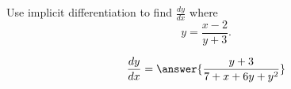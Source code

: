\documentclass{ximera}
\author{Steven Gubkin}
\begin{document}
\begin{exercise}

Use implicit differentiation to find $\frac{dy}{dx}$ where
\[
y = \frac{x-2}{y+3}.
\]
\begin{prompt}
\[
\frac{dy}{dx} = \answer{\frac{y+3}{7+x+6y+y^2}}
\]
\end{prompt}
\end{exercise}
\end{document}
